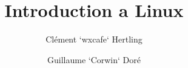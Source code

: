 \title{Introduction a Linux}
\author{Clément `wxcafe` Hertling \newline \and Guillaume `Corwin` Doré}
